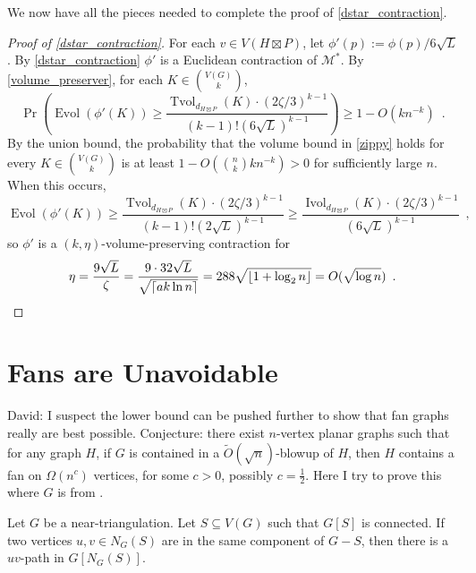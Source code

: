 \documentclass{patmorin}
\renewcommand{\ge}{\geqslant}
\newcommand{\david}[1]{{\color{orange} David: #1}}
\DeclareMathOperator{\evol}{Evol}
\DeclareMathOperator{\ivol}{Ivol}
\DeclareMathOperator{\tvol}{Tvol}
\begin{document}
We now have all the pieces needed to complete the proof of \cref{dstar_contraction}.

\begin{proof}[Proof of \cref{dstar_contraction}]
  For each $v\in V(H\boxtimes P)$, let $\phi'(p):=\phi(p)/6\sqrt{L}$. By \cref{dstar_contraction} $\phi'$ is a Euclidean contraction of $\mathcal{M}^*$.  By \cref{volume_preserver}, for each $K\in \binom{V(G)}{k}$,
  \begin{equation}
    \Pr\left(\evol(\phi'(K)) \ge \frac{\tvol_{d_{H\boxtimes P}}(K)\cdot(2\zeta/3)^{k-1}}{(k-1)!(6\sqrt{L})^{k-1}}\right) \ge 1- O(kn^{-k}) \enspace .
    \label{zippy}
  \end{equation}
  By the union bound, the probability that the volume bound in \cref{zippy} holds for every $K\in\binom{V(G)}{k}$ is at least $1-O(\binom{n}{k}kn^{-k}) > 0$ for sufficiently large $n$.  When this occurs,
  \[
    \evol(\phi'(K)) \ge \frac{\tvol_{d_{H\boxtimes P}}(K)\cdot(2\zeta/3)^{k-1}}{(k-1)!(2\sqrt{L})^{k-1}} \ge
    \frac{\ivol_{d_{H\boxtimes P}}(K)\cdot(2\zeta/3)^{k-1}}{(6\sqrt{L})^{k-1}} \enspace ,
  \]
  so $\phi'$ is a $(k,\eta)$-volume-preserving contraction for
  \[
    \eta = \frac{9\sqrt{L}}{\zeta} = \frac{9\cdot 32\sqrt{L}}{\sqrt{\lceil ak\ln n\rceil}} = {288\sqrt{{\lfloor 1+\log_2 n \rfloor}}} = O(\sqrt{\log n}) \enspace . \qedhere
  \]
\end{proof}


\section{Fans are Unavoidable}
\david{I suspect the lower bound can be pushed further to show  that fan graphs really are best possible. Conjecture: there exist $n$-vertex planar graphs such that for any graph $H$, if $G$ is contained in  a $\tilde{O}(\sqrt{n})$-blowup of $H$, then $H$ contains a fan on $\Omega(n^c)$ vertices, for some $c>0$, possibly $c=\frac12$. Here I try to prove this where $G$ is from \citep{LMST08}. }

\begin{lem}
\label{FindPath}
Let $G$ be a near-triangulation. Let $S\subseteq V(G)$ such that $G[S]$ is connected. If two vertices $u,v\in N_G(S)$ are in the same component of $G-S$, then there is a $uv$-path in $G[ N_G(S) ]$.
\end{lem}
\end{document}
